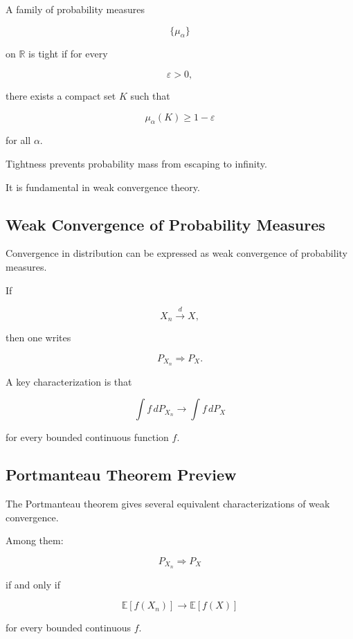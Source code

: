 A family of probability measures

\[
\{\mu_\alpha\}
\]

on \(\mathbb{R}\) is tight if for every

\[
\varepsilon>0,
\]

there exists a compact set \(K\) such that

\[
\boxed{
\mu_\alpha(K)
\geq
1-\varepsilon
}
\]

for all \(\alpha\).

Tightness prevents probability mass from escaping to infinity.

It is fundamental in weak convergence theory.

\subsection{Weak Convergence of Probability Measures}
\label{subsec:weak-convergence-measures}

Convergence in distribution can be expressed as weak convergence of
probability measures.

If

\[
X_n\xrightarrow{d}X,
\]

then one writes

\[
\boxed{
P_{X_n}
\Rightarrow
P_X.
}
\]

A key characterization is that

\[
\boxed{
\int f\,dP_{X_n}
\to
\int f\,dP_X
}
\]

for every bounded continuous function \(f\).

\subsection{Portmanteau Theorem Preview}
\label{subsec:portmanteau-preview}

The Portmanteau theorem gives several equivalent characterizations of
weak convergence.

Among them:

\[
P_{X_n}\Rightarrow P_X
\]

if and only if

\[
\boxed{
\mathbb{E}[f(X_n)]
\to
\mathbb{E}[f(X)]
}
\]

for every bounded continuous \(f\).

